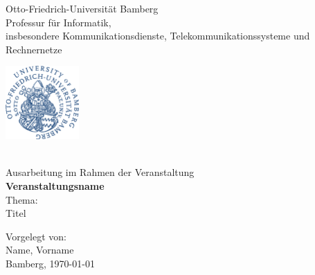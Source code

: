 \begin{titlepage}
  \centering
    \begin{minipage}[t]{16cm}
      \hfill
      \begin{minipage}{12cm}
        \centering
        Otto-Friedrich-Universit\"{a}t Bamberg
        \\[12pt]
        {\Large Professur f\"ur Informatik,
        \\
        insbesondere Kommunikationsdienste, Telekommunikationssysteme
        und Rechnernetze}
      \end{minipage}
      \hfill
      \begin{minipage}{3cm}
        \includegraphics[height=28mm]{bilder/ubamlogo.png} %
      \end{minipage}
    \end{minipage}\\[108pt]%
    {\LARGE Ausarbeitung  im Rahmen der Veranstaltung}
    \\[36pt]
    {\LARGE\bf Veranstaltungsname}\\[80pt]
    {\LARGE Thema:}\\[36pt]
    {\Huge Titel}\\
    \vfill
    \begin{minipage}{\textwidth}
      \center
      Vorgelegt von:\\
      {\Large Name, Vorname\\[18pt]}
      Bamberg, \today
    \end{minipage}
  \end{titlepage}
